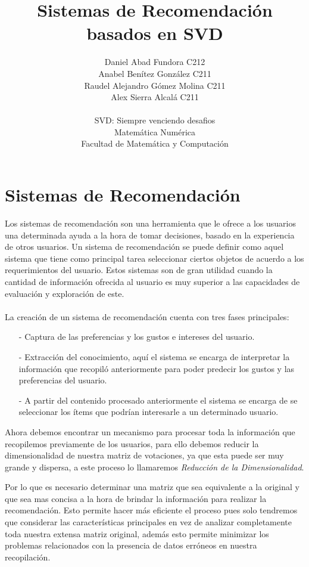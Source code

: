 \documentclass{article}
\title{Sistemas de Recomendación basados en SVD}
\author{Daniel Abad Fundora C212\\
		Anabel Benítez González C211\\
		Raudel Alejandro Gómez Molina C211\\
		Alex Sierra Alcalá C211\\\\		
  \small SVD: Siempre venciendo desafios\\
  \small Matemática Numérica\\
  \small Facultad de Matemática y Computación 
}
\begin{document}
\maketitle

\section{Sistemas de Recomendación}

Los sistemas de recomendación son una herramienta que le ofrece a los usuarios una determinada ayuda a la hora de tomar decisiones, basado en la experiencia de otros usuarios. Un sistema de recomendación se puede definir como aquel sistema que tiene como principal tarea seleccionar ciertos objetos de acuerdo a los requerimientos del usuario. Estos sistemas son de gran utilidad cuando la cantidad de información ofrecida al usuario es muy superior a las capacidades de evaluación y exploración de este.\\\\
La creación de un sistema de recomendación cuenta con tres fases principales:
\begin{enumerate}
	\item[-] Captura de las preferencias y los gustos e intereses del usuario.
	\item[-] Extracción del conocimiento, aquí el sistema se encarga de interpretar la información que recopiló anteriormente para poder predecir los gustos y las preferencias del usuario.
	\item[-] A partir del contenido procesado anteriormente el sistema se encarga de se seleccionar los ítems que podrían interesarle a un determinado usuario.
\end{enumerate}

Ahora debemos encontrar un mecanismo para procesar toda la información que recopilemos previamente de los usuarios, para ello debemos reducir la dimensionalidad de nuestra matriz de votaciones, ya que esta puede ser muy grande y dispersa, a este proceso lo llamaremos \textit{Reducción de la Dimensionalidad}. 

Por lo que es necesario determinar una matriz que sea equivalente a la original y que sea mas concisa a la hora de brindar la información para realizar la recomendación. Esto permite hacer más eficiente el proceso pues solo tendremos que considerar las características principales en vez de analizar completamente toda nuestra extensa matriz original, además esto permite minimizar los problemas relacionados con la presencia de datos erróneos en nuestra recopilación.
\end{document}
